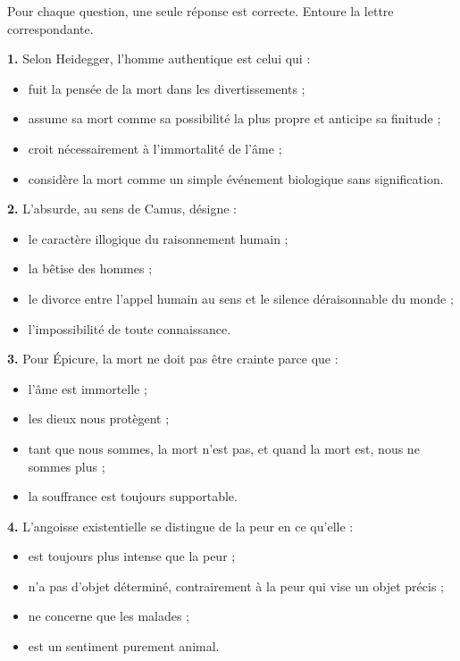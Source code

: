 \documentclass[11pt]{article}
\begin{document}
\begin{exercice}
Pour chaque question, une seule réponse est correcte. Entoure la lettre correspondante.

\textbf{1.} Selon Heidegger, l'homme authentique est celui qui :
\begin{itemize}
\item[a)] fuit la pensée de la mort dans les divertissements ;
\item[b)] assume sa mort comme sa possibilité la plus propre et anticipe sa finitude ;
\item[c)] croit nécessairement à l'immortalité de l'âme ;
\item[d)] considère la mort comme un simple événement biologique sans signification.
\end{itemize}

\textbf{2.} L'absurde, au sens de Camus, désigne :
\begin{itemize}
\item[a)] le caractère illogique du raisonnement humain ;
\item[b)] la bêtise des hommes ;
\item[c)] le divorce entre l'appel humain au sens et le silence déraisonnable du monde ;
\item[d)] l'impossibilité de toute connaissance.
\end{itemize}

\textbf{3.} Pour Épicure, la mort ne doit pas être crainte parce que :
\begin{itemize}
\item[a)] l'âme est immortelle ;
\item[b)] les dieux nous protègent ;
\item[c)] tant que nous sommes, la mort n'est pas, et quand la mort est, nous ne sommes plus ;
\item[d)] la souffrance est toujours supportable.
\end{itemize}

\textbf{4.} L'angoisse existentielle se distingue de la peur en ce qu'elle :
\begin{itemize}
\item[a)] est toujours plus intense que la peur ;
\item[b)] n'a pas d'objet déterminé, contrairement à la peur qui vise un objet précis ;
\item[c)] ne concerne que les malades ;
\item[d)] est un sentiment purement animal.
\end{itemize}
\end{exercice}
\end{document}
